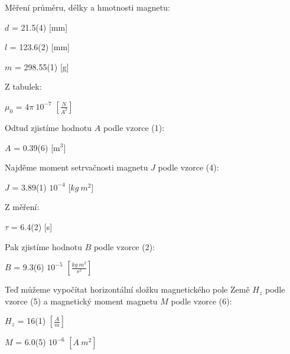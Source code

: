 \documentclass[a4paper,11pt]{article}
\begin{document}
\begin{minipage}[t]{0.5\textwidth}
                \vspace{20pt}
                \raggedright
            \par Měření průměru, délky a hmotnosti magnetu: 
            \begin{center}
                $d$ = 21.5(4) [mm]
                \par $l$ = 123.6(2) [mm]
                \par $m$ = 298.55(1) [g]
            \end{center}
            Z tabulek: 
            \begin{center}
                $\mu_0$ = $4\pi ~ 10^{-7}$ $\left[ \frac{N}{A^2} \right]$
            \end{center}
            \par Odtud zjistíme hodnotu $A$ podle vzorce (1): 
            \begin{center}
                $A$ = 0.39(6) [m$^3$]
            \end{center}
            Najděme moment setrvačnosti magnetu $J$ podle vzorce (4):
            \begin{center}
                $J$ = 3.89(1) $10^{-4}$ [$kg ~ m^2$]
            \end{center}
            Z měření: 
            \begin{center}
                $\tau$ = 6.4(2) [s]
            \end{center}
            Pak zjistíme hodnotu $B$ podle vzorce (2):
            \begin{center}
                $B$ = 9.3(6) $10^{-5}$ $\left[\frac{kg ~ m^2}{s^2} \right]$
            \end{center}
            Teď můžeme vypočítat horizontální složku magnetického pole Země $H_z$ podle vzorce (5) a magnetický moment magnetu $M$ podle vzorce (6):
            \begin{center}
                $H_z$ = 16(1) $\left[\frac{A}{m} \right]$
                \vspace{10pt}
                \par $M$ = 6.0(5) $10^{-6}$ $\left[A ~ m^2 \right]$
            \end{center}
    \end{minipage}
\newpage
\end{document}
